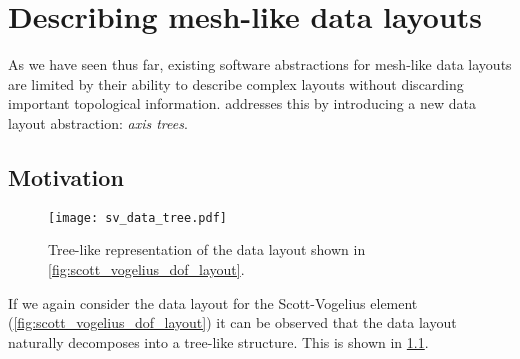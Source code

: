 \documentclass[thesis]{subfiles}
\begin{document}
\chapter{Describing mesh-like data layouts}
\label{chapter:axis_trees}

As we have seen thus far, existing software abstractions for mesh-like data layouts are limited by their ability to describe complex layouts without discarding important topological information.
 addresses this by introducing a new data layout abstraction: \textit{axis trees}.

\section{Motivation} %

\begin{figure}
  \centering
  \texttt{[image: sv\_data\_tree.pdf]}
  \caption{Tree-like representation of the data layout shown in \cref{fig:scott_vogelius_dof_layout}.}
  \label{fig:sv_data_tree}
\end{figure}

If we again consider the data layout for the Scott-Vogelius element (\cref{fig:scott_vogelius_dof_layout}) it can be observed that the data layout naturally decomposes into a tree-like structure.
This is shown in \cref{fig:sv_data_tree}.
\end{document}
